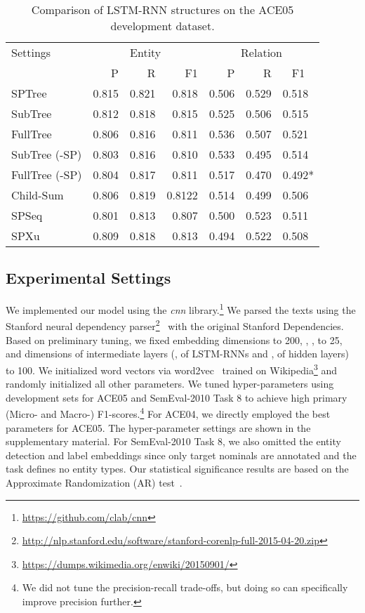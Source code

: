 \documentclass[11pt]{article}
\begin{document}
\begin{table*}[t!]
\centering
\begin{tabular}{|lrrrrrl|}
\hline
Settings & \multicolumn{3}{c}{Entity} & \multicolumn{3}{c|}{Relation} \\
             & P  & R & F1 & P & R & \multicolumn{1}{c|}{F1}\\
\hline
\hline
SPTree & 0.815 & 0.821 & 0.818 & 0.506 & 0.529 & 0.518 \\
SubTree & 0.812 & 0.818 & 0.815 & 0.525 & 0.506 & 0.515 \\
FullTree & 0.806 & 0.816 & 0.811 & 0.536 & 0.507 & 0.521 \\ 
SubTree (-SP) & 0.803 & 0.816 & 0.810 & 0.533 & 0.495 & 0.514 \\
FullTree (-SP) & 0.804 & 0.817 & 0.811 & 0.517 & 0.470 & 0.492*\\
\hline
Child-Sum & 0.806 & 0.819 & 0.8122 & 0.514 & 0.499 & 0.506 \\
SPSeq & 0.801 & 0.813 & 0.807 & 0.500 & 0.523 & 0.511 \\
SPXu & 0.809 & 0.818 & 0.813 & 0.494 & 0.522 & 0.508 \\
\hline
\end{tabular}
\caption{Comparison of LSTM-RNN structures on the ACE05 development dataset. }
\label{tbl:ace05-lstm-dev}
\end{table*}

\subsection{Experimental Settings}

We implemented our model using the {\it cnn}
library.\footnote{{\scriptsize\url{https://github.com/clab/cnn}}}
We parsed the texts using the Stanford neural dependency
parser\footnote{{\scriptsize\url{http://nlp.stanford.edu/software/stanford-corenlp-full-2015-04-20.zip}}}~\cite{chen-manning:2014:EMNLP2014} with the original Stanford Dependencies.
Based on preliminary tuning, we fixed embedding dimensions  to 200,
, ,  to 25, and
dimensions of intermediate layers (,  of LSTM-RNNs and ,  of hidden layers) to 100.
We initialized word vectors via word2vec~\cite{mikolov2013distributed} trained on Wikipedia\footnote{{\scriptsize\url{https://dumps.wikimedia.org/enwiki/20150901/}}} and randomly initialized all other parameters.
We tuned hyper-parameters using development sets for ACE05 and SemEval-2010 Task 8 to achieve high primary (Micro- and Macro-) F1-scores.\footnote{We did not tune the precision-recall trade-offs, but doing so can specifically improve precision further.} For ACE04, we directly employed the best parameters for ACE05. The hyper-parameter settings are shown in the supplementary material. 
For SemEval-2010 Task 8, we also omitted the entity detection and label embeddings since only target nominals are annotated and the task defines no entity types. 
Our statistical significance results are based on the Approximate Randomization (AR) test~\cite{noreen89:_comput_inten_method_for_testin_hypot}.
\end{document}
